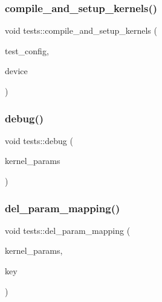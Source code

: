 \mbox{\label{namespacetests_af43423e70aab84bb15efb97001a0c262}} 
\subsubsection{\texorpdfstring{compile\+\_\+and\+\_\+setup\+\_\+kernels()}{compile\_and\_setup\_kernels()}}
{\footnotesize\ttfamily void tests\+::compile\+\_\+and\+\_\+setup\+\_\+kernels (\begin{DoxyParamCaption}\item[{\hyperlink{structtests_1_1TestConfig}{tests\+::\+Test\+Config} \&}]{test\+\_\+config,  }\item[{\hyperlink{classllk_1_1Device}{llk\+::\+Device} \&}]{device }\end{DoxyParamCaption})}

\mbox{\label{namespacetests_aba02a7b523ddea64948c65e3d8721ec9}} 
\subsubsection{\texorpdfstring{debug()}{debug()}}
{\footnotesize\ttfamily void tests\+::debug (\begin{DoxyParamCaption}\item[{\hyperlink{structtests_1_1KernelParams}{Kernel\+Params} \&}]{kernel\+\_\+params }\end{DoxyParamCaption})}

\mbox{\label{namespacetests_ac5d7bfff1d97fa0a9d6e5f7694a88921}} 
\subsubsection{\texorpdfstring{del\+\_\+param\+\_\+mapping()}{del\_param\_mapping()}}
{\footnotesize\ttfamily void tests\+::del\+\_\+param\+\_\+mapping (\begin{DoxyParamCaption}\item[{\hyperlink{structtests_1_1KernelParams}{Kernel\+Params} \&}]{kernel\+\_\+params,  }\item[{std\+::string}]{key }\end{DoxyParamCaption})}

